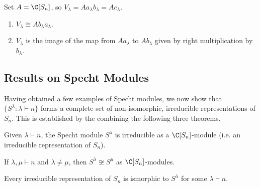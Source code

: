 \documentclass[../main.tex]{subfiles}
\begin{document}
\begin{proposition}
  Set $ A = \C[S_{n}]$, so $ V_{\lambda} = A a_{\lambda} b_{\lambda} = A c_{\lambda}$.
  \begin{enumerate}
    \item $ V_{\lambda} \cong Ab_{\lambda}a_{\lambda} $.
    \item $V_{\lambda}$ is the image of the map from $ A a_{\lambda} $ to $ A b_{\lambda} $ given by right multiplication by $ b_{\lambda} $.
  \end{enumerate}
\end{proposition}

\subsection{Results on Specht Modules}
Having obtained a few examples of Specht modules, we now show that $ \{S^{\lambda}: \lambda\vdash n\} $ forms a complete set of non-isomorphic, irreducible representations of $ S_{n} $. This is established by the combining the following three theorems.
\begin{theorem}
  Given $ \lambda\vdash n $, the Specht module $ S^{\lambda} $ is irreducible as a $ \C[S_{n}] $-module (i.e. an irreducible representation of $ S_{n} $).
\end{theorem}

\begin{theorem}
  If $ \lambda,\mu\vdash n $ and $ \lambda\neq \mu $, then $ S^{\lambda}\not\cong S^{\mu} $ as $ \C[S_{n}] $-modules.
\end{theorem}

\begin{theorem}
  Every irreducible representation of $ S_{n} $ is ismorphic to $ S^{\lambda} $ for some $ \lambda\vdash n $.  
\end{theorem}
\end{document}
